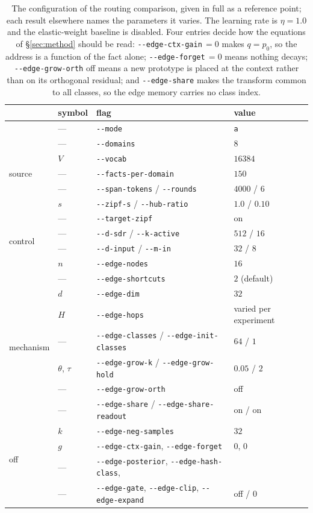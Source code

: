 \documentclass[11pt,a4paper]{article}
\begin{document}
\begin{table}[h]
\centering
\small
\begin{tabular}{llll}
\toprule
& symbol & flag & value \\
\midrule
\multirow{7}{*}{source}
 & --- & \texttt{-{}-mode} & \texttt{a} \\
 & --- & \texttt{-{}-domains} & $8$ \\
 & $V$ & \texttt{-{}-vocab} & $16384$ \\
 & --- & \texttt{-{}-facts-per-domain} & $150$ \\
 & --- & \texttt{-{}-span-tokens} / \texttt{-{}-rounds} & $4000$ / $6$ \\
 & $s$ & \texttt{-{}-zipf-s} / \texttt{-{}-hub-ratio} & $1.0$ / $0.10$ \\
 & --- & \texttt{-{}-target-zipf} & on \\
\midrule
\multirow{2}{*}{control}
 & --- & \texttt{-{}-d-sdr} / \texttt{-{}-k-active} & $512$ / $16$ \\
 & --- & \texttt{-{}-d-input} / \texttt{-{}-m-in} & $32$ / $8$ \\
\midrule
\multirow{9}{*}{mechanism}
 & $n$ & \texttt{-{}-edge-nodes} & $16$ \\
 & --- & \texttt{-{}-edge-shortcuts} & $2$ (default) \\
 & $d$ & \texttt{-{}-edge-dim} & $32$ \\
 & $H$ & \texttt{-{}-edge-hops} & varied per experiment \\
 & --- & \texttt{-{}-edge-classes} / \texttt{-{}-edge-init-classes} & $64$ / $1$ \\
 & $\theta$, $\tau$ & \texttt{-{}-edge-grow-k} / \texttt{-{}-edge-grow-hold} & $0.05$ / $2$ \\
 & --- & \texttt{-{}-edge-grow-orth} & off \\
 & --- & \texttt{-{}-edge-share} / \texttt{-{}-edge-share-readout} & on / on \\
 & $k$ & \texttt{-{}-edge-neg-samples} & $32$ \\
\midrule
\multirow{2}{*}{off}
 & $g$ & \texttt{-{}-edge-ctx-gain}, \texttt{-{}-edge-forget} & $0$, $0$ \\
 & --- & \texttt{-{}-edge-posterior}, \texttt{-{}-edge-hash-class}, & \\
 & --- & \texttt{-{}-edge-gate}, \texttt{-{}-edge-clip}, \texttt{-{}-edge-expand} & off / $0$ \\
\bottomrule
\end{tabular}
\caption{The configuration of the routing comparison, given in full as a
reference point; each result elsewhere names the parameters it varies. The
learning rate is $\eta=1.0$ and the elastic-weight baseline is disabled. Four
entries decide how the equations of \S\ref{sec:method} should be read:
\texttt{-{}-edge-ctx-gain}$\,=0$ makes $q=p_0$, so the address is a function of
the fact alone; \texttt{-{}-edge-forget}$\,=0$ means nothing decays;
\texttt{-{}-edge-grow-orth} off means a new prototype is placed at the context
rather than on its orthogonal residual; and \texttt{-{}-edge-share} makes the
transform common to all classes, so the edge memory carries no class index.}
\end{table}
\end{document}
